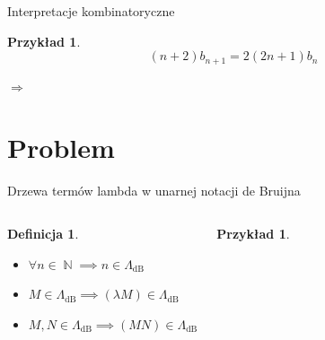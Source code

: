 \documentclass[final]{beamer}
\theoremstyle{bluetheorem}
\theoremstyle{bluetheorem}
\newtheorem{mydefinition}[mytheorem]{Definicja}
\theoremstyle{greentheorem}
\newtheorem{myexample}[mytheorem]{Przykład}
\newcommand{\LambdadB}{\ensuremath{\Lambda_{\text{dB}}}}
\DeclareMathOperator{\N}{\mathbb{N}}
\newcommand{\includeinlinescaledsvg}[3]{\begin{minipage}{#1\textwidth}\begin{center}\end{center}\end{minipage}}
\begin{document}
\begin{frame}{Interpretacje kombinatoryczne}
    \begin{myexample}
        \[(n + 2)b_{n + 1} = 2 (2n + 1)b_n\]

        \begin{center}
            \small
            \begin{minipage}{.20\textwidth}\end{minipage}%
            \(\Rightarrow\)
            \begin{minipage}{.3\textwidth}\end{minipage}%
            \begin{minipage}{.3\textwidth}\end{minipage}%
        \end{center}
    \end{myexample}
\end{frame}

\section{Problem}

\begin{frame}{Drzewa termów lambda w unarnej notacji de Bruijna}
    \begin{columns}
        \begin{mydefinition}
            \begin{itemize}
                \item \(\forall n \in \N \implies n \in \LambdadB\)
                \item \(M \in \LambdadB \implies (\lambda M) \in \LambdadB\)
                \item \(M, N \in \LambdadB \implies (M N) \in \LambdadB\)
            \end{itemize}
        \end{mydefinition}

        \begin{myexample}
            \begin{center}
                \includeinlinescaledsvg{1}{0.6}{lambda__tree_structure__deBruijn_002_no_green_custom}
            \end{center}
        \end{myexample}
    \end{columns}
\end{frame}
\end{document}
